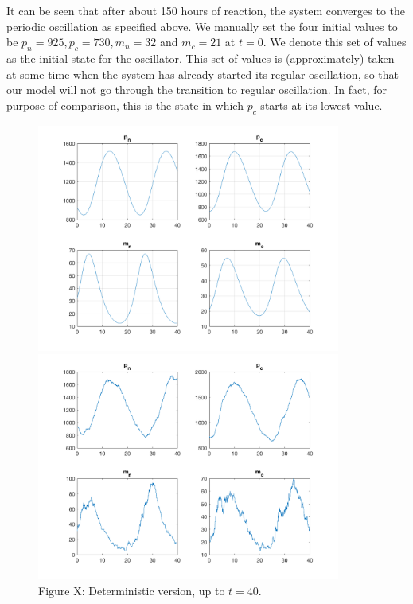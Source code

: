 \documentclass[12pt]{article}
\renewcommand{\(}{\left (}
\renewcommand{\)}{\right )}
\begin{document}
It can be seen that after about 150 hours of reaction, the system converges to the periodic oscillation as specified above. We manually set the four initial values to be $p_n = 925, p_c = 730,m_n = 32$ and $m_c = 21$ at $t=0.$ We denote this set of values as the initial state for the oscillator. This set of values is (approximately) taken at some time when the system has already started its regular oscillation, so that our model will not go through the transition to regular oscillation. In fact, for purpose of comparison, this is the state in which $p_c$ starts at its lowest value.

\begin{figure}[h]
    \centering
	\begin{minipage}{0.45\textwidth}
		\centering
		\includegraphics[width=0.89\textwidth]{single_oscillator_zoom_in.png}
		\caption*{\small Figure X: Deterministic version, up to $t=40.$}
	\end{minipage}
	\begin{minipage}{0.45\textwidth}
		\centering
		\includegraphics[width=0.89\textwidth]{sto_single_oscillator_zoom_in.png}

\end{minipage}
\end{figure}
\end{document}
